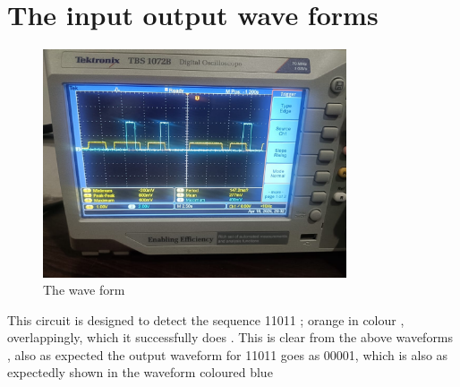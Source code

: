 \documentclass[a4paper,12pt]{article}
\begin{document}
\section{The input output wave forms}
\begin{figure}[H]
    \centering
    \includegraphics[width=0.8\textwidth]{figs/plot.jpeg}
    \caption{The wave form}
    \label{fig:your_image_label}
\end{figure}

This circuit is designed to detect the sequence 11011 ; orange in colour , overlappingly, which it successfully does . This is clear from the above waveforms , also as expected the output waveform for 11011 goes as 00001, which is also as expectedly shown in the waveform coloured blue
\end{document}
